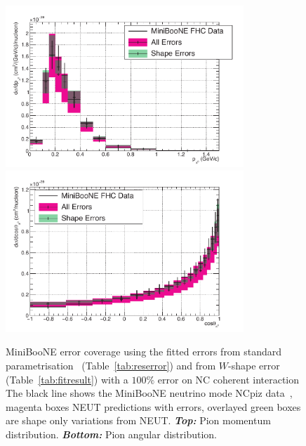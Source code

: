 \begin{figure}[ht]
  \center
  \includegraphics[width=0.8\textwidth]{T2K-TN-254/images/systematics/MB_NC1pi0_1Dppi0_fhc_nu_1WShape_highNCCoh_good.pdf} \\ %
  \includegraphics[width=0.8\textwidth]{T2K-TN-254/images/systematics/MB_NC1pi0_1Dcospi0_fhc_nu_1WShape_highNCCoh_good.pdf} %
  \caption[MiniBooNE error coverage using the fitted errors and an
  additional error for NC COH events]{\Gls{MiniBooNE} error coverage
    using the fitted errors from standard parametrisation~\cite{TN315}
    (Table~\ref{tab:reserror}) and from $W$-shape error
    (Table~\ref{tab:fitresult}) with a $100\%$ error on \Gls{NC}
    coherent interaction The black line shows the \Gls{MiniBooNE}
    neutrino mode \Gls{NC}\gls{piz} data~\cite{AguilarArevalo:2009ww},
    magenta boxes \Gls{NEUT} predictions with errors, overlayed green
    boxes are shape only variations from
    \Gls{NEUT}. \textbf{\textit{Top:}} Pion momentum
    distribution. \textbf{\textit{Bottom:}} Pion angular
    distribution.}
  \label{fig:miniboonepostfitcoh}
\end{figure}

